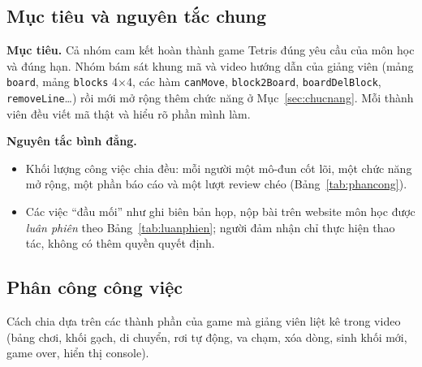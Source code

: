 \documentclass[a4paper]{article}
\begin{document}
\subsection{Mục tiêu và nguyên tắc chung}
\textbf{Mục tiêu.} Cả nhóm cam kết hoàn thành game Tetris đúng yêu cầu của môn học và đúng hạn. Nhóm bám sát khung mã và video hướng dẫn của giảng viên (mảng \texttt{board}, mảng \texttt{blocks} 4$\times$4, các hàm \texttt{canMove}, \texttt{block2Board}, \texttt{boardDelBlock}, \texttt{removeLine}\ldots) rồi mới mở rộng thêm chức năng ở Mục~\ref{sec:chucnang}. Mỗi thành viên đều viết mã thật và hiểu rõ phần mình làm.

\textbf{Nguyên tắc bình đẳng.}
\begin{itemize}

  \item Khối lượng công việc chia đều: mỗi người một mô-đun cốt lõi, một chức năng mở rộng, một phần báo cáo và một lượt review chéo (Bảng~\ref{tab:phancong}).
  \item Các việc ``đầu mối'' như ghi biên bản họp, nộp bài trên website môn học được \emph{luân phiên} theo Bảng~\ref{tab:luanphien}; người đảm nhận chỉ thực hiện thao tác, không có thêm quyền quyết định.
\end{itemize}

\subsection{Phân công công việc}
Cách chia dựa trên các thành phần của game mà giảng viên liệt kê trong video (bảng chơi, khối gạch, di chuyển, rơi tự động, va chạm, xóa dòng, sinh khối mới, game over, hiển thị console).
\end{document}
